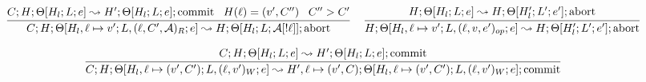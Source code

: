\documentclass[9pt]{article}
\newcommand{\aeval}[1]{\mathcal{A}[#1]}
\newcommand{\actxt}[0]{\mathcal{A}}
\newcommand{\loc}[0]{\ell}
\newcommand{\commit}[0]{\text{commit}}
\newcommand{\abort}[0]{\text{abort}}
\begin{document}
\[%
\infer[]{C; H; \Theta[H_l, \loc \mapsto v'; L, (\loc,C',\actxt)_R; e] \leadsto H; \Theta[H_l; L; \aeval{!\loc}]; \abort}{C; H; \Theta[H_l; L; e] \leadsto H'; \Theta[H_l; L; e]; \commit \;\;\; H(\loc) = (v', C'') \;\;\; C'' > C'} \;\;\;
\infer[]{H; \Theta[H_l, \loc \mapsto v'; L, (\loc,v,e')_{op}; e] \leadsto H; \Theta[H_l'; L'; e']; \abort}{H; \Theta[H_l; L; e] \leadsto H; \Theta[H_l'; L'; e']; \abort} 
\]

\[%
\infer[]{C; H; \Theta[H_l, \loc \mapsto (v', C'); L, (\loc,v')_W; e] \leadsto H', \loc \mapsto (v', C); \Theta[H_l,\loc \mapsto (v', C'); L, (\loc,v')_W; e]; \commit}{C; H; \Theta[H_l; L; e] \leadsto H'; \Theta[H_l; L; e]; \commit} 
\]

\endgroup
\end{document}
